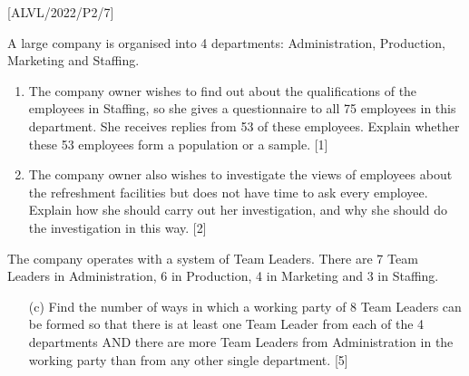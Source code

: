 \item {[}ALVL/2022/P2/7{]}

A large company is organised into 4 departments: Administration, Production,
Marketing and Staffing.
\begin{enumerate}
\item The company owner wishes to find out about the qualifications of the
employees in Staffing, so she gives a questionnaire to all 75 employees
in this department. She receives replies from 53 of these employees.
Explain whether these 53 employees form a population or a sample.\hfill{}
{[}1{]}
\item The company owner also wishes to investigate the views of employees
about the refreshment facilities but does not have time to ask every
employee. Explain how she should carry out her investigation, and
why she should do the investigation in this way.\hfill{} {[}2{]}
\end{enumerate}
The company operates with a system of Team Leaders. There are 7 Team
Leaders in Administration, 6 in Production, 4 in Marketing and 3 in
Staffing.
\begin{enumerate}
\item[(c)]  Find the number of ways in which a working party of 8 Team Leaders
can be formed so that there is at least one Team Leader from each
of the 4 departments AND there are more Team Leaders from Administration
in the working party than from any other single department.\hfill{}
{[}5{]}
\end{enumerate}
